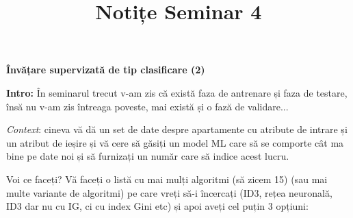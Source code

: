 \documentclass[12pt]{article}
\title{%
	\textbf{Notițe Seminar 4}}
\begin{document}
	
	\maketitle
	
	\textbf{\large{Învățare supervizată de tip clasificare (2)}}
	
	\textbf{Intro:} În seminarul trecut v-am zis că există faza de antrenare și faza de testare, însă nu v-am zis întreaga poveste, mai există și o fază de validare...
	
	\textit{Context}: cineva vă dă un set de date despre apartamente cu atribute de intrare și un atribut de ieșire și vă cere să găsiți un model ML care să se comporte cât ma bine pe date noi și să furnizați un număr care să indice acest lucru.
	
	Voi ce faceți? Vă faceți o listă cu mai mulți algoritmi (să zicem 15) (sau mai multe variante de algoritmi) pe care vreți să-i încercați (ID3, rețea neuronală, ID3 dar nu cu IG, ci cu index Gini etc) și apoi aveți cel puțin 3 opțiuni:
\end{document}
